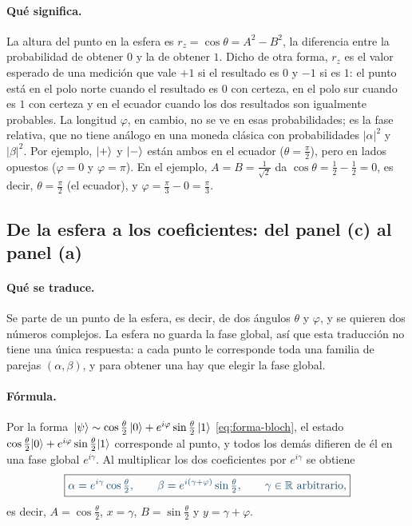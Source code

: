 \paragraph{Qué significa.}
La altura del punto en la esfera es $r_z=\cos\theta=A^2-B^2$, la diferencia entre la
probabilidad de obtener $0$ y la de obtener $1$. Dicho de otra forma, $r_z$ es el valor esperado de una medición que vale $+1$ si el resultado es $0$ y $-1$ si es $1$: el punto está en
el polo norte cuando el resultado es $0$ con certeza, en el polo sur cuando es $1$ con certeza y
en el ecuador cuando los dos resultados son igualmente probables. La longitud $\varphi$, en
cambio, no se ve en esas probabilidades; es la fase relativa, que no tiene análogo en una moneda clásica con probabilidades $|\alpha|^2$ y $|\beta|^2$. Por ejemplo, $\lvert +\rangle$ y $\lvert -\rangle$ están ambos en el ecuador
($\theta=\frac\pi2$), pero en lados opuestos ($\varphi=0$ y $\varphi=\pi$). En el ejemplo,
$A=B=\frac1{\sqrt2}$ da $\cos\theta=\frac12-\frac12=0$, es decir, $\theta=\frac\pi2$ (el
ecuador), y $\varphi=\frac\pi3-0=\frac\pi3$.

\subsection*{De la esfera a los coeficientes: del panel (c) al panel (a)}

\paragraph{Qué se traduce.}
Se parte de un punto de la esfera, es decir, de dos ángulos $\theta$ y $\varphi$, y se quieren
dos números complejos. La esfera no guarda la fase global, así que esta traducción no tiene una
única respuesta: a cada punto le corresponde toda una familia de parejas $(\alpha,\beta)$, y
para obtener una hay que elegir la fase global.

\paragraph{Fórmula.}
Por la forma~$\lvert \psi\rangle\sim\cos\tfrac\theta2\,\lvert 0\rangle+e^{i\varphi}\sin\tfrac\theta2\,\lvert 1\rangle$ \eqref{eq:forma-bloch},
el estado $\cos\frac\theta2\lvert 0\rangle+e^{i\varphi}\sin\frac\theta2\lvert 1\rangle$ corresponde al punto, y todos los demás
difieren de él en una fase global $e^{i\gamma}$. Al multiplicar los dos coeficientes por
$e^{i\gamma}$ se obtiene
\begin{equation}\label{eq:c-a}
  \destacado{\alpha=e^{i\gamma}\cos\tfrac\theta2,\qquad
  \beta=e^{i(\gamma+\varphi)}\sin\tfrac\theta2,\qquad \gamma\in\mathbb R\text{ arbitrario},}
\end{equation}
es decir, $A=\cos\frac\theta2$, $x=\gamma$, $B=\sin\frac\theta2$ y $y=\gamma+\varphi$.

